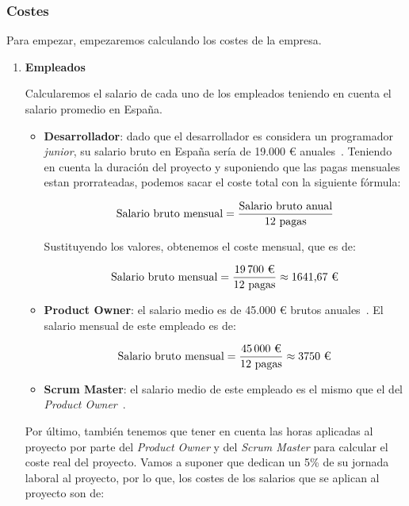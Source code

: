 \subsubsection{Costes}

Para empezar, empezaremos calculando los costes de la empresa.

\begin{enumerate}
    \item \textbf{Empleados}
    \par
    Calcularemos el salario de cada uno de los empleados teniendo en cuenta el salario promedio en España.
    \begin{itemize}
        \item \textbf{Desarrollador}: dado que el desarrollador es considera un programador \textit{junior}, su salario bruto en España sería de 19.000 € anuales~\cite{salario:junior}. Teniendo en cuenta la duración del proyecto y suponiendo que las pagas mensuales estan prorrateadas, podemos sacar el coste total con la siguiente fórmula:
        
        \[\textup{Salario bruto mensual} = \frac{\textup{Salario bruto anual}}{\textup{12 pagas}}\]

        \par

        Sustituyendo los valores, obtenemos el coste mensual, que es de:

        \[\textup{Salario bruto mensual} = \frac{\textup{19\,700 €}}{\textup{12 pagas}} \approx \textup{1641,67 €}\]
        \item \textbf{Product Owner}: el salario medio es de 45.000 € brutos anuales~\cite{salario:owner}. El salario mensual de este empleado es de:

        \[\textup{Salario bruto mensual} = \frac{\textup{45\,000 €}}{\textup{12 pagas}} \approx \textup{3750 €}\]

        \item \textbf{Scrum Master}: el salario medio de este empleado es el mismo que el del \textit{Product Owner}~\cite{salario:master}.
        
    \end{itemize}

    Por último, también tenemos que tener en cuenta las horas aplicadas al proyecto por parte del \textit{Product Owner} y del \textit{Scrum Master} para calcular el coste real del proyecto. Vamos a suponer que dedican un 5\% de su jornada laboral al proyecto, por lo que, los costes de los salarios que se aplican al proyecto son de:


\end{enumerate}
